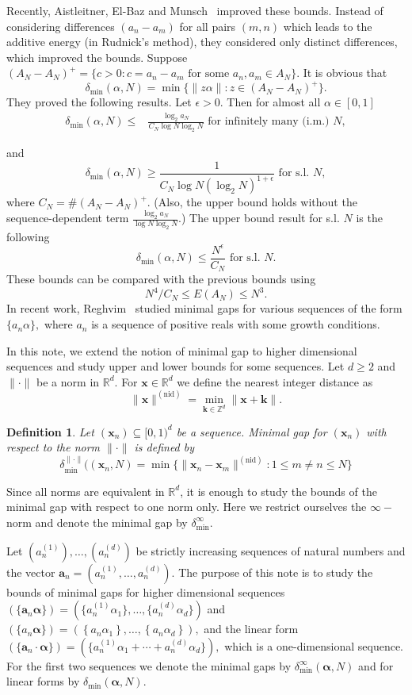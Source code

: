 \documentclass[12pt,article]{amsart}
\newtheorem*{definition}{Definition}
\theoremstyle{remark}
\numberwithin{equation}{section}
\newcommand{\R}{\mathbb{R}}
\newcommand{\Z}{\mathbb{Z}}
\newcommand{\boldx}{\boldsymbol{x}}
\newcommand{\bolda}{\boldsymbol{a}}
\newcommand{\boldxn}{\boldsymbol{x}_n}
\newcommand{\boldalpha}{\boldsymbol{\alpha}}
\begin{document}
	Recently, Aistleitner, El-Baz and Munsch~\cite{Aistleitner2021minimalgap} improved these bounds. Instead of considering differences $(a_n-a_m)$ for all pairs $(m,n)$ which leads to the additive energy (in Rudnick's method), they considered only distinct differences, which improved the bounds. Suppose $(A_N-A_N)^+=\{c>0: c=a_n-a_m \text{ for some }a_n,a_m\in A_N\}.$ It is obvious that 
	\[\delta_{\text{min}}(\alpha,N)=\min\{\|z\alpha\|: z\in(A_N-A_N)^+\}.\]
	They proved the following results. Let $\epsilon>0.$ Then for almost all $\alpha\in[0,1]$
	\begin{align*}
		\delta_{\text{min}}(\alpha,N)\leq&\frac{\log_2 a_N}{C_N\log N\log_2 N}\text{ for infinitely many (i.m.) }N,
	\end{align*}
	
	and
	\[\delta_{\text{min}}(\alpha,N)\geq\frac{1}{C_N\log N(\log_2 N)^{1+\epsilon}}\text{ for s.l. }N,\]
	where $C_N=\#(A_N-A_N)^{+}.$
	(Also, the upper bound holds without the sequence-dependent term $\frac{\log_2 a_N}{\log N \log_2 N}.$) The upper bound result for s.l. $N$ is the following
	\[\delta_{\text{min}}(\alpha,N)\leq\frac{N^\epsilon}{C_N}\text{ for s.l. }N.\] 
	These bounds can be compared with the previous bounds using 
	\[N^4/C_N\leq E(A_N)\leq N^3.\]
	In recent work, Reghvim~\cite{shvoreghvim2021} studied minimal gaps for various sequences of the form $\{a_n\alpha\},$  where $a_n$ is a sequence of positive reals with some growth conditions. 
	
	In this note, we extend the notion of minimal gap to higher dimensional sequences and study upper and lower bounds for some sequences. Let $d\geq 2$ and $\|\cdot\|$ be a norm in $\R^d.$ For $\boldx\in\R^d$ we define the nearest integer distance as  $$\|\boldx\|^{(\text{nid})}=\displaystyle\min_{\boldsymbol{k}\in\Z^d}\|\boldx+\boldsymbol{k}\|.$$ 
	\begin{definition}
		Let $(\boldxn)\subseteq[0,1)^d$ be a sequence. Minimal gap for $(\boldxn)$ with respect to the norm $\|\cdot\|$ is defined by
		$$\delta_{\text{min}}^{\|\cdot\|}((\boldxn,N)=\min\{\|\boldxn-\boldx_m\|^{(\text{nid})}: 1\leq m\neq n\leq N\}$$
	\end{definition}
	
	Since all norms are equivalent in $\R^d$, it is enough to study the bounds of the minimal gap with respect to one norm only. Here we restrict ourselves the $\infty-$norm and denote the minimal gap by $\delta_{\text{min}}^\infty.$
	
	Let $(a_n^{(1)}),\ldots,(a_n^{(d)})$ be strictly increasing sequences of natural numbers and the vector $\bolda_n=(a_n^{(1)},\dots,a_n^{(d)})$. 
	The purpose of this note is to study the bounds of minimal gaps for higher dimensional sequences $(\{\bolda_n\boldalpha\})=(\{a_n^{(1)}\alpha_1\},\dots,\{a_n^{(d)}\alpha_d\})$ and $(\{a_n\boldalpha\})=\left(\left\{a_n\alpha_1\right\},\dots,\left\{a_n\alpha_d\right\}\right),$ and the linear form $(\{\bolda_n\cdot\boldalpha\})=(\{a_n^{(1)}\alpha_1+\cdots+a_n^{(d)}\alpha_d\}),$ which is a one-dimensional sequence. For the first two sequences we denote the minimal gaps by $\delta_{\text{min}}^{\infty}(\boldalpha,N)$ and for linear forms by $\delta_{\text{min}}(\boldalpha,N).$ 
	
\end{document}
